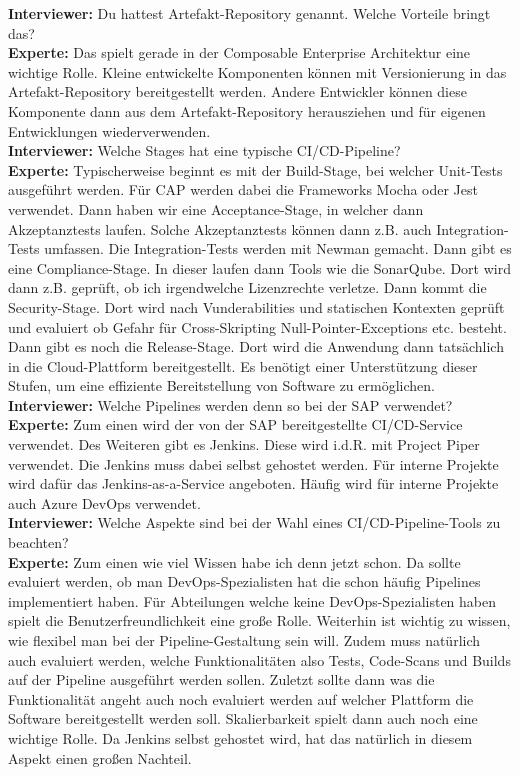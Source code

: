 \begin{linenumbers}
\textbf{Interviewer:} Du hattest Artefakt-Repository genannt. Welche Vorteile bringt das?\\
\textbf{Experte:} Das spielt gerade in der Composable Enterprise Architektur eine wichtige Rolle. Kleine entwickelte Komponenten können mit Versionierung in das Artefakt-Repository bereitgestellt werden. Andere Entwickler können diese Komponente dann aus dem Artefakt-Repository herausziehen und für eigenen Entwicklungen wiederverwenden.\\
\textbf{Interviewer:} Welche Stages hat eine typische CI/CD-Pipeline?\\ 
\textbf{Experte:} Typischerweise beginnt es mit der Build-Stage, bei welcher Unit-Tests ausgeführt werden. Für CAP werden dabei die Frameworks Mocha oder Jest verwendet. Dann haben wir eine Acceptance-Stage, in welcher dann Akzeptanztests laufen. Solche Akzeptanztests können dann z.B. auch Integration-Tests umfassen. Die Integration-Tests werden mit Newman gemacht. Dann gibt es eine Compliance-Stage. In dieser laufen dann Tools wie die SonarQube. Dort wird dann z.B. geprüft, ob ich irgendwelche Lizenzrechte verletze. Dann kommt die Security-Stage. Dort wird nach Vunderabilities und statischen Kontexten geprüft und evaluiert ob Gefahr für Cross-Skripting Null-Pointer-Exceptions etc. besteht. Dann gibt es noch die Release-Stage. Dort wird die Anwendung dann tatsächlich in die Cloud-Plattform bereitgestellt. Es benötigt einer Unterstützung dieser Stufen, um eine effiziente Bereitstellung von Software zu ermöglichen.\\
\textbf{Interviewer:} Welche Pipelines werden denn so bei der SAP verwendet?\\
\textbf{Experte:} Zum einen wird der von der SAP bereitgestellte CI/CD-Service verwendet. Des Weiteren gibt es Jenkins. Diese wird i.d.R. mit Project Piper verwendet. Die Jenkins muss dabei selbst gehostet werden. Für interne Projekte wird dafür das Jenkins-as-a-Service angeboten. Häufig wird für interne Projekte auch Azure DevOps verwendet.\\
\textbf{Interviewer:} Welche Aspekte sind bei der Wahl eines CI/CD-Pipeline-Tools zu beachten?\\
\textbf{Experte:} Zum einen wie viel Wissen habe ich denn jetzt schon. Da sollte evaluiert werden, ob man DevOps-Spezialisten hat die schon häufig Pipelines implementiert haben. Für Abteilungen welche keine DevOps-Spezialisten haben spielt die Benutzerfreundlichkeit eine große Rolle. Weiterhin ist wichtig zu wissen, wie flexibel man bei der Pipeline-Gestaltung sein will. Zudem muss natürlich auch evaluiert werden, welche Funktionalitäten also Tests, Code-Scans und Builds auf der Pipeline ausgeführt werden sollen. Zuletzt sollte dann was die Funktionalität angeht auch noch evaluiert werden auf welcher Plattform die Software bereitgestellt werden soll. Skalierbarkeit spielt dann auch noch eine wichtige Rolle. Da Jenkins selbst gehostet wird, hat das natürlich in diesem Aspekt einen großen Nachteil.\\ 

\end{linenumbers}
